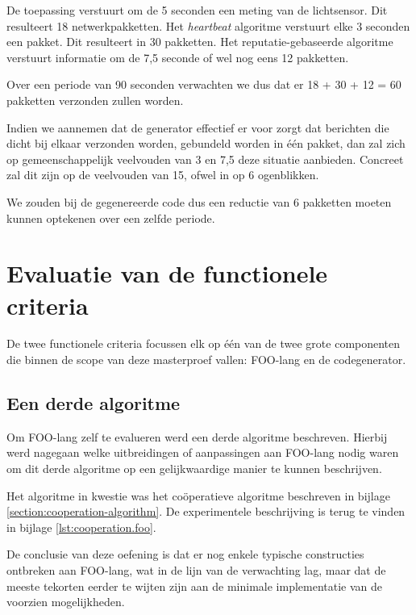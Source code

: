 De toepassing verstuurt om de 5 seconden een meting van de lichtsensor. Dit
resulteert 18 netwerkpakketten. Het \emph{heartbeat} algoritme verstuurt elke 3
seconden een pakket. Dit resulteert in 30 pakketten. Het reputatie-gebaseerde
algoritme verstuurt informatie om de 7,5 seconde of wel nog eens 12 pakketten.

Over een periode van 90 seconden verwachten we dus dat er 18 + 30 + 12 = 60
pakketten verzonden zullen worden.

Indien we aannemen dat de generator effectief er voor zorgt dat berichten die
dicht bij elkaar verzonden worden, gebundeld worden in \'e\'en pakket, dan zal
zich op gemeenschappelijk veelvouden van 3 en 7,5 deze situatie aanbieden.
Concreet zal dit zijn op de veelvouden van 15, ofwel in op 6 ogenblikken.

We zouden bij de gegenereerde code dus een reductie van 6 pakketten moeten
kunnen optekenen over een zelfde periode.

\vspace{-3mm}

\section{Evaluatie van de functionele criteria}
\label{section:evaluation-functionals}

De twee functionele criteria focussen elk op \'e\'en van de twee grote
componenten die binnen de scope van deze masterproef vallen: FOO-lang en de
codegenerator.

\vspace{-3mm}

\subsection{Een derde algoritme}

Om FOO-lang zelf te evalueren werd een derde algoritme beschreven. Hierbij werd
nagegaan welke uitbreidingen of aanpassingen aan FOO-lang nodig waren om dit
derde algoritme op een gelijkwaardige manier te kunnen beschrijven.

Het algoritme in kwestie was het co\"operatieve algoritme beschreven in bijlage
\ref{section:cooperation-algorithm}. De experimentele beschrijving is terug te
vinden in bijlage \ref{lst:cooperation.foo}.

De conclusie van deze oefening is dat er nog enkele typische constructies
ontbreken aan FOO-lang, wat in de lijn van de verwachting lag, maar dat de
meeste tekorten eerder te wijten zijn aan de minimale implementatie van de
voorzien mogelijkheden.

